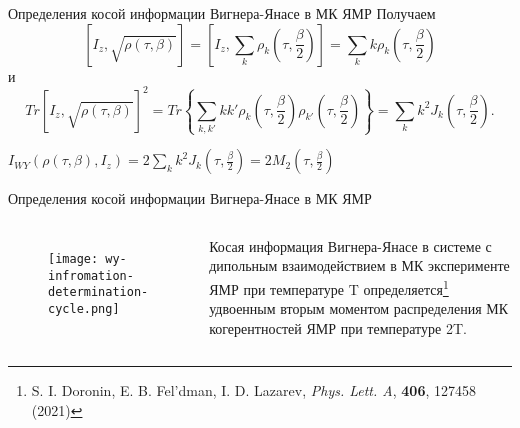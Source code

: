 \begin{frame}{Определения косой информации Вигнера-Янасе в МК ЯМР}
Получаем
%
$$
    \left[I_z,\sqrt{\rho(\tau,\beta)}\right]
    = \left[I_z, \sum_k \rho_k \left(\tau, \frac{\beta}{2}\right)\right]
    = \sum_k k\rho_k \left(\tau, \frac{\beta}{2}\right)
$$
%
и
%
$$
	Tr\left[I_z,\sqrt{\rho(\tau,\beta)} \right]^2
	= Tr\left\{\sum_{k,k'}kk'
		\rho_k\left(\tau,\frac{\beta}{2}\right)
		\rho_{k'}\left(\tau,\frac{\beta}{2}\right)
	\right\}
	= \sum_k k^2 J_k\left(\tau,\frac{\beta}{2}\right).
$$


\begin{alertblock}{}
\centering
$
  I_{WY}\left(\rho(\tau, \beta), I_z\right)
  = 2\sum_k k^2 J_k\left(\tau, \frac{\beta}{2}\right)
  = 2M_2\left(\tau, \frac{\beta}{2}\right)
$
\end{alertblock}

\end{frame}

\begin{frame}{Определения косой информации Вигнера-Янасе в МК ЯМР}
  \begin{columns}
  \begin{figure}
    \texttt{[image: wy-infromation-determination-cycle.png]}
  \end{figure}
  Косая информация Вигнера-Янасе в системе с дипольным взаимодействием в МК эксперименте ЯМР при температуре T
  определяется\footnote[frame]{S. I. Doronin, E. B. Fel'dman,  I. D. Lazarev, \textit{Phys. Lett. A}, \textbf{406}, 127458 (2021)}
  удвоенным вторым моментом распределения МК когерентностей ЯМР при температуре 2T.
  \end{columns}
\end{frame}



